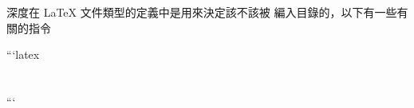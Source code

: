 \begin{markdown}
深度在 LaTeX 文件類型的定義中是用來決定該不該被 \tableofcontent 編入目錄的，以下有一些有關的指令

```latex
\setcounter{tocdepth}{2}%

\section*{}%

```
\end{markdown}